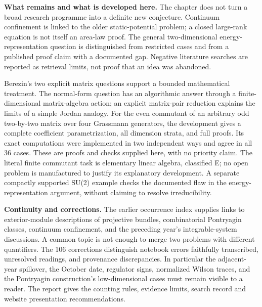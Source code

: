 \noindent\textbf{What remains and what is developed here.}
The chapter does not turn a broad research programme into a definite new conjecture.
Continuum confinement is linked to the older static-potential problem; a closed
large-rank equation is not itself an area-law proof. The general two-dimensional
energy-representation question is distinguished from restricted cases and from a
published proof claim with a documented gap. Negative literature searches are reported as retrieval
limits, not proof that an idea was abandoned.

Berezin's two explicit matrix questions support a bounded mathematical treatment.
The normal-form question has an algorithmic answer through a finite-dimensional
matrix-algebra action; an explicit matrix-pair reduction explains the limits of a
simple Jordan analogy. For the even commutant of an arbitrary odd two-by-two matrix
over four Grassmann generators, the development gives a complete coefficient
parametrization, all dimension strata, and full proofs. Its exact computations were
implemented in two independent ways and agree in all 36 cases. These are proofs
and checks supplied here, with no priority claim. The literal finite commutant task
is elementary linear algebra, classified E; no open problem is manufactured to
justify its explanatory development. A separate compactly supported SU(2) example
checks the documented flaw in the energy-representation argument, without claiming
to resolve irreducibility.

\noindent\textbf{Continuity and corrections.}
The earlier occurrence index supplies links to exterior-module descriptions of
projective bundles, combinatorial Pontryagin classes, continuum confinement, and
the preceding year's integrable-system discussions. A common topic is not enough
to merge two problems with different quantifiers. The 106 corrections distinguish
notebook errors faithfully transcribed, unresolved readings, and provenance
discrepancies. In particular the adjacent-year
spillover, the October date, regulator signs, normalized Wilson traces, and the
Pontryagin construction's low-dimensional cases must remain visible to a reader.
The report gives the counting rules, evidence limits, search record and website
presentation recommendations.
